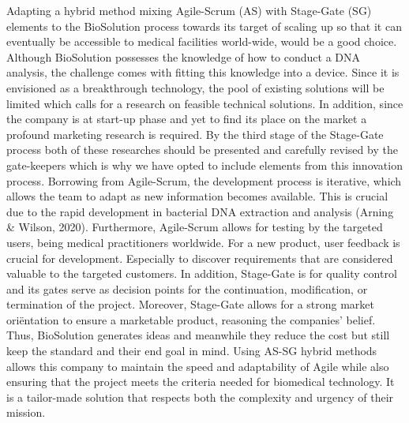 \documentclass[a4paper,10pt,UTF8]{scrartcl}
\begin{document}
Adapting a hybrid method mixing Agile-Scrum (AS) with Stage-Gate (SG) elements to the BioSolution process towards its target of scaling up so that it can eventually be accessible to medical facilities world-wide, would be a good choice. Although BioSolution possesses the knowledge of how to conduct a DNA analysis, the challenge comes with fitting this knowledge into a device. Since it is envisioned as a breakthrough technology, the pool of existing solutions will be limited which calls for a research on feasible technical solutions. In addition, since the company is at start-up phase and yet to find its place on the market a profound marketing research is required. By the third stage of the Stage-Gate process both of these researches should be presented and carefully revised by the gate-keepers which is why we have opted to include elements from this innovation process. Borrowing from Agile-Scrum, the development process is iterative, which allows the team to adapt as new information becomes available. This is crucial due to the rapid development in bacterial DNA extraction and analysis (Arning \& Wilson, 2020)\cite{arning2020past}. Furthermore, Agile-Scrum allows for testing by the targeted users, being medical practitioners worldwide. For a new product, user feedback is crucial for development. Especially to discover requirements that are considered valuable to the targeted customers. In addition, Stage-Gate is for quality control and its gates serve as decision points for the continuation, modification, or termination of the project. Moreover, Stage-Gate allows for a strong market oriëntation to ensure a marketable product, reasoning the companies’ belief. Thus, BioSolution generates ideas and meanwhile they reduce the cost but still keep the standard and their end goal in mind. Using AS-SG hybrid methods allows this company to maintain the speed and adaptability of Agile while also ensuring that the project meets the criteria needed for biomedical technology. It is a tailor-made solution that respects both the complexity and urgency of their mission.
\end{document}
